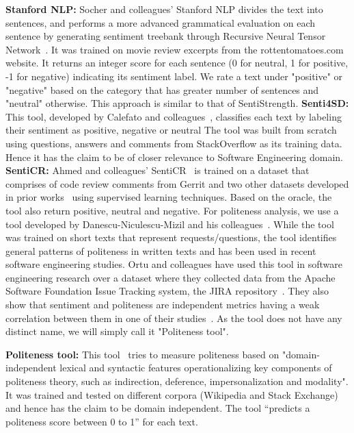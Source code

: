 \newline
\indent\textbf{Stanford NLP:} Socher and colleagues' Stanford NLP 
divides the text into sentences, 
and performs a more advanced grammatical evaluation 
on each sentence 
by generating sentiment treebank 
through Recursive Neural Tensor Network~\cite{socher2013recursive}.
It was trained on movie review excerpts 
from the rottentomatoes.com website. 
It returns an integer score for each sentence (0 for neutral, 1 for positive, -1 for negative) indicating its sentiment label. We rate a text under "positive" or "negative" based on the category that has greater number of sentences and "neutral" otherwise. This approach is similar to that of SentiStrength.
\newline
\indent\textbf{Senti4SD:} This tool, 
developed by Calefato and colleagues~\cite{calefato2017sentiment}, classifies each text by labeling their sentiment 
as positive, negative or neutral 
The tool was built
from scratch using 
questions, answers and comments 
from StackOverflow as its training data. 
Hence it has the claim to be of closer relevance to Software Engineering domain.
\newline
\indent \textbf{SentiCR:} Ahmed and colleagues' SentiCR~\cite{ahmed2017senticr} 
is trained on a dataset 
that comprises of 
code review comments from Gerrit and 
two other datasets developed 
in prior works~\cite{calefato2017sentiment,murgia2014developers} using supervised learning techniques. 
Based on the oracle, 
the tool also return positive, neutral and negative.
\newline
\newline
For politeness analysis, we use a tool developed by Danescu-Nicu\-lescu-Mizil and his colleagues~\cite{danescu2013computational}. 
While the tool was trained on short texts 
that represent requests/questions, 
the tool identifies general patterns of politeness 
in written texts and 
has been used in recent software engineering studies.
Ortu and colleagues have used this tool in software engineering research over a dataset where they collected data from the Apache Software Foundation Issue Tracking system, the JIRA repository~\cite{ortu2015would,ortu2015bullies}. They also show that sentiment and politeness are independent metrics having a weak correlation between them in one of their studies~\cite{ortu2015bullies}. As the tool does not have any distinct name, we will simply call it "Politeness tool". 

\textbf{Politeness tool:} This tool~\cite{danescu2013computational} tries to measure politeness based on "domain-independent lexical and syntactic features operationalizing key components of politeness theory, such as indirection, deference, impersonalization and modality". 
It was trained and tested 
on different corpora (Wikipedia and Stack Exchange) 
and hence has the claim to be domain independent. 
The tool ``predicts a politeness score between 0 to 1'' 
for each text.   

